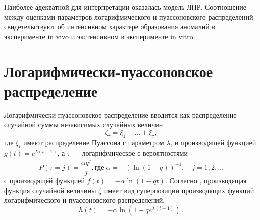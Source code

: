 \documentclass{math-mech-sci}
\begin{document}
	Наиболее адекватной для интерпретации оказалась модель  ЛПР. Соотношение между оценками параметров  логарифмического и пуассоновского распределений свидетельствуют об интенсивном характере  образования аномалий в эксперименте in vivo и экстенсивном в эксперименте in vitro.
	
	\section{Логарифмически-пуассоновское распределение}
	
	Логарифмически-пуассоновское распределение вводится как распределение  случайной суммы независимых случайных величин
	\[
		\zeta_\tau = \xi _1 + \dots + \xi _\tau,
	\]
	где $\xi _i$ имеют распределение Пуассона с параметром $\lambda$,  и производящей функцией $g(t) = e ^{\lambda(t - 1)}$, а $\tau$ --- логарифмическое  с  вероятностями
	\[
		P(\tau = j) = \frac {\alpha q ^j} {j}, \text{где}~ \alpha = -(\ln(1 - q)) ^{-1}, \quad j = 1, 2, \dots 
	\]
	с производящей функцией $f(t) = -\alpha \ln(1 - qt)$.
%
		Согласно \cite{bib:feller1952}, производящая функция случайной величины $\zeta$ имеет вид суперпозиции производящих функций  логарифмического и пуассоновского распределений,
			\begin{equation}\label{lpr:pfm}
			h (t) = -\alpha \ln (1 - q e ^{\lambda (t - 1)})\,.
		\end{equation}
%		
%	
%	
%
%	
\end{document}
